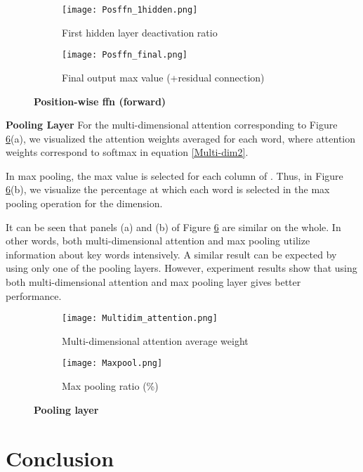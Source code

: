 \documentclass[11pt,letterpaper]{article}
\begin{document}
\begin{figure}[h]
\centering
\begin{subfigure}{.5\textwidth}
  \centering
  \texttt{[image: Posffn\_1hidden.png]}
  \caption{First hidden layer deactivation ratio}
  \label{posffn_1hidden}
\end{subfigure}
\begin{subfigure}{.5\textwidth}
  \centering
  \texttt{[image: Posffn\_final.png]}
  \caption{Final output max value (+residual connection)}
  \label{posffn_final}
\end{subfigure}
\caption{\textbf{Position-wise ffn (forward)}}
\label{Posffn_}
\end{figure}

\textbf{Pooling Layer} For the multi-dimensional attention corresponding to Figure \ref{pooling}(a), we visualized the attention weights averaged for each word, where attention weights correspond to softmax in equation \ref{Multi-dim2}.

In max pooling, the max value is selected for each column of . Thus, in Figure \ref{pooling}(b), we visualize the percentage at which each word is selected in the max pooling operation for the  dimension.

It can be seen that panels (a) and (b) of Figure \ref{pooling} are similar on the whole. In other words, both multi-dimensional attention and max pooling utilize information about key words intensively. A similar result can be expected by using only one of the pooling layers. However, experiment results show that using both multi-dimensional attention and max pooling layer gives better performance.

\begin{figure}[h]
\centering
\begin{subfigure}{.5\textwidth}
  \centering
  \texttt{[image: Multidim\_attention.png]}
  \caption{Multi-dimensional attention average weight}
  \label{multidim_attention}
\end{subfigure}
\begin{subfigure}{.5\textwidth}
  \centering
  \texttt{[image: Maxpool.png]}
  \caption{Max pooling ratio (\%)}
  \label{maxpool}
\end{subfigure}
\caption{\textbf{Pooling layer}}
\label{pooling}
\end{figure}


\section{Conclusion}
\end{document}
